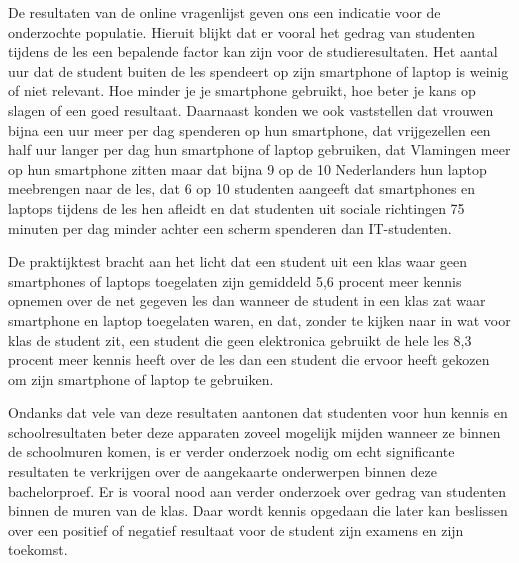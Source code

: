 De resultaten van de online vragenlijst geven ons een indicatie voor de onderzochte populatie. Hieruit blijkt dat er vooral het gedrag van studenten tijdens de les een bepalende factor kan zijn voor de studieresultaten. Het aantal uur dat de student buiten de les spendeert op zijn smartphone of laptop is weinig of niet relevant. Hoe minder je je smartphone gebruikt, hoe beter je kans op slagen of een goed resultaat. Daarnaast konden we ook vaststellen dat vrouwen bijna een uur meer per dag spenderen op hun smartphone, dat vrijgezellen een half uur langer per dag hun smartphone of laptop gebruiken, dat Vlamingen meer op hun smartphone zitten maar dat bijna 9 op de 10 Nederlanders hun laptop meebrengen naar de les, dat 6 op 10 studenten aangeeft dat smartphones en laptops tijdens de les hen afleidt en dat studenten uit sociale richtingen 75 minuten per dag minder achter een scherm spenderen dan IT-studenten.

De praktijktest bracht aan het licht dat een student uit een klas waar geen smartphones of laptops toegelaten zijn gemiddeld 5,6 procent meer kennis opnemen over de net gegeven les dan wanneer de student in een klas zat waar smartphone en laptop toegelaten waren, en dat, zonder te kijken naar in wat voor klas de student zit, een student die geen elektronica gebruikt de hele les 8,3 procent meer kennis heeft over de les dan een student die ervoor heeft gekozen om zijn smartphone of laptop te gebruiken.

Ondanks dat vele van deze resultaten aantonen dat studenten voor hun kennis en schoolresultaten beter deze apparaten zoveel mogelijk mijden wanneer ze binnen de schoolmuren komen, is er verder onderzoek nodig om echt significante resultaten te verkrijgen over de aangekaarte onderwerpen binnen deze bachelorproef. Er is vooral nood aan verder onderzoek over gedrag van studenten binnen de muren van de klas. Daar wordt kennis opgedaan die later kan beslissen over een positief of negatief resultaat voor de student zijn examens en zijn toekomst. 
